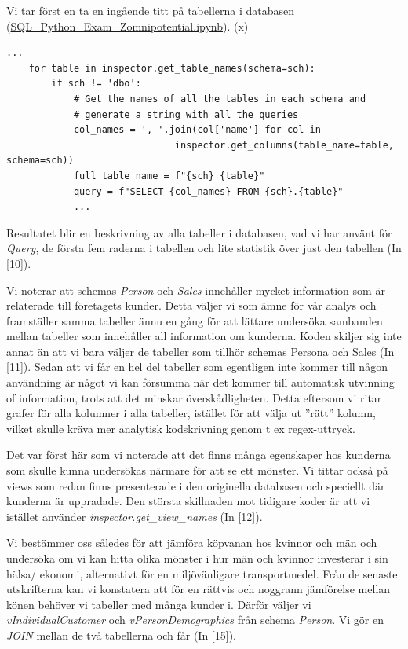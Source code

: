 \documentclass[10pt]{article}
\begin{document}
Vi tar först en ta en ingående titt på tabellerna i databasen (\href{https://github.com/Zomnipotential/EC\_SQL\_Python\_Quiz/blob/main/SQL\_Python\_Exam\_Zomnipotential.ipynb}{SQL\_Python\_Exam\_Zomnipotential.ipynb}).
\if(x)
\begin{lstlisting}
...
    for table in inspector.get_table_names(schema=sch):
        if sch != 'dbo':
            # Get the names of all the tables in each schema and
            # generate a string with all the queries
            col_names = ', '.join(col['name'] for col in 
            			      inspector.get_columns(table_name=table, schema=sch))
            full_table_name = f"{sch}_{table}"
            query = f"SELECT {col_names} FROM {sch}.{table}"
            ...
\end{lstlisting}
\fi
Resultatet blir en beskrivning av alla tabeller i databasen, vad vi har använt för \emph{Query}, de första fem raderna i tabellen och lite statistik över just den tabellen (In [10]).

Vi noterar att schemas \emph{Person} och \emph{Sales} innehåller mycket information som är relaterade till företagets kunder. Detta väljer vi som ämne för vår analys och framställer samma tabeller ännu en gång för att lättare undersöka sambanden mellan tabeller som innehåller all information om kunderna. Koden skiljer sig inte annat än att vi bara väljer de tabeller som tillhör schemas Persona och Sales (In [11]). Sedan att vi får en hel del tabeller som egentligen inte kommer till någon användning är något vi kan försumma när det kommer till automatisk utvinning of information, trots att det minskar överskådligheten. Detta eftersom vi ritar grafer för alla kolumner i alla tabeller, istället för att välja ut ''rätt'' kolumn, vilket skulle kräva mer analytisk kodskrivning genom t ex regex-uttryck.

Det var först här som vi noterade att det finns många egenskaper hos kunderna som skulle kunna undersökas närmare för att se ett mönster. Vi tittar också på views som redan finns presenterade i den originella databasen och speciellt där kunderna är uppradade. Den största skillnaden mot tidigare koder är att vi istället använder \emph{inspector.get\_view\_names} (In [12]).

Vi bestämmer oss således för att jämföra köpvanan hos kvinnor och män och undersöka om vi kan hitta olika mönster i hur män och kvinnor investerar i sin hälsa/ ekonomi, alternativt för en miljövänligare transportmedel. Från de senaste utskrifterna kan vi konstatera att för en rättvis och noggrann jämförelse mellan könen behöver vi tabeller med många kunder i. Därför väljer vi \emph{vIndividualCustomer} och \emph{vPersonDemographics} från schema \emph{Person}. Vi gör en \emph{JOIN} mellan de två tabellerna och får (In [15]).
\end{document}
